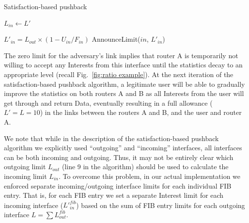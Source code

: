 \documentclass[10pt,conference]{IEEEtran}
\begin{document}
{ 
\begin{algorithm}[t]
\footnotesize
\caption{\small Satisfaction-based pushback}
\label{alg:dynamic limits}
\begin{algorithmic}[1]
\State{} 
\vspace{0.1cm}
  

\vspace{0.1cm}

\State{} 
    \State $L_{in} \leftarrow L'$
\EndFunction

\vspace{0.1cm}

 

        \State $L'_{in}= {L_{out}} \times (1 - U_{in}/F_{in})$
        \State AnnounceLimit($in$, $L'_{in}$)
   \EndFor

\EndFor
\EndFunction

\end{algorithmic}
\end{algorithm}


The zero limit for the adversary's link implies that  router A is temporarily not willing to accept any Interests from this interface until the statistics decay to an appropriate level (recall Fig.~\ref{fig:ratio example}).
At the next iteration of the satisfaction-based pushback algorithm, a legitimate user will be able to gradually improve the statistics on both routers A and B as all Interests from the user will get through and return Data, eventually resulting in a full allowance ($L'=L=10$) in the links between the routers A and B, and the user and router A.

We note that while in the description of the satisfaction-based pushback algorithm we explicitly used ``outgoing'' and ``incoming'' interfaces,  all interfaces can be both incoming and outgoing.
Thus, it may not be entirely clear which outgoing limit $L_{out}$ (line 9 in the algorithm) should be used to calculate the incoming limit $L_{in}$.
To overcome this problem, in our actual implementation we enforced separate incoming/outgoing interface limits for each individual FIB entry.
That is, for each FIB entry we set a separate Interest limit for each incoming interface (${L'}_{in}^{fib}$) based on the sum of FIB entry limits for each outgoing interface $L=\sum{L_{out}^{fib}}$.


}
\end{document}
